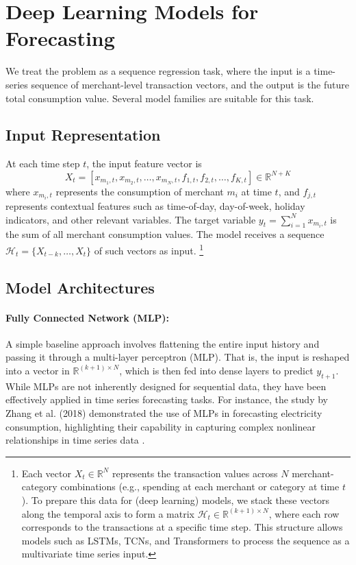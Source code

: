 \documentclass{article}
\begin{document}
\section{Deep Learning Models for Forecasting}

We treat the problem as a sequence regression task, where the input is a time-series sequence of merchant-level transaction vectors, and the output is the future total consumption value. Several model families are suitable for this task.

\subsection{Input Representation}

At each time step \( t \), the input feature vector is
\[
X_t = [x_{m_1,t}, x_{m_2,t}, \dots, x_{m_N,t}, f_{1,t}, f_{2,t}, \dots, f_{K,t}] \in \mathbb{R}^{N+K}
\]
where \( x_{m_i,t} \) represents the consumption of merchant \( m_i \) at time \( t \), and \( f_{j,t} \) represents contextual features such as time-of-day, day-of-week, holiday indicators, and other relevant variables. The target variable \( y_t = \sum_{i=1}^N x_{m_i,t} \) is the sum of all merchant consumption values. The model receives a sequence \( \mathcal{H}_t = \{X_{t-k}, \dots, X_t\} \) of such vectors as input. \footnote{Each vector \( X_t \in \mathbb{R}^N \) represents the transaction values across \( N \) merchant-category combinations (e.g., spending at each merchant or category at time \( t \)). To prepare this data for (deep learning) models, we stack these vectors along the temporal axis to form a matrix \( \mathcal{H}_t \in \mathbb{R}^{(k+1) \times N} \), where each row corresponds to the transactions at a specific time step. This structure allows models such as LSTMs, TCNs, and Transformers to process the sequence as a multivariate time series input.}

\subsection{Model Architectures}

\paragraph{Fully Connected Network (MLP):} A simple baseline approach involves flattening the entire input history and passing it through a multi-layer perceptron (MLP). That is, the input is reshaped into a vector in \( \mathbb{R}^{(k+1) \times N} \), which is then fed into dense layers to predict \( y_{t+1} \). While MLPs are not inherently designed for sequential data, they have been effectively applied in time series forecasting tasks. For instance, the study by Zhang et al. (2018) demonstrated the use of MLPs in forecasting electricity consumption, highlighting their capability in capturing complex nonlinear relationships in time series data \cite{zhang2018electricity}.
\end{document}
